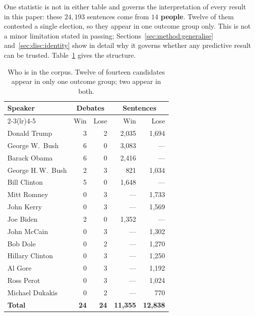 \documentclass[journal]{IEEEtran}
\begin{document}
One statistic is not in either table and governs the interpretation of every
result in this paper: these $24{,}193$ sentences come from
\textbf{$14$ people}. Twelve of them contested a single election, so they
appear in one outcome group only. This is not a minor limitation stated in
passing; Sections~\ref{sec:method:generalise} and~\ref{sec:disc:identity}
show in detail why it governs whether any predictive result can be trusted.
Table~\ref{tab:speakers} gives the structure.

\begin{table}[t]
\caption{Who is in the corpus. Twelve of fourteen candidates appear in only
one outcome group; two appear in both.}
\label{tab:speakers}
\centering
\footnotesize
\setlength{\tabcolsep}{4pt}
\begin{tabular}{lrrrr}
\toprule
Speaker & \multicolumn{2}{c}{Debates} & \multicolumn{2}{c}{Sentences} \\
\cmidrule(lr){2-3}\cmidrule(lr){4-5}
        & Win & Lose & Win & Lose \\
\midrule
Donald Trump        & 3 & 2 & 2{,}035 & 1{,}694 \\
George W.\ Bush     & 6 & 0 & 3{,}083 & --- \\
Barack Obama        & 6 & 0 & 2{,}416 & --- \\
George H.\,W.\ Bush & 2 & 3 & 821     & 1{,}034 \\
Bill Clinton        & 5 & 0 & 1{,}648 & --- \\
Mitt Romney         & 0 & 3 & ---     & 1{,}733 \\
John Kerry          & 0 & 3 & ---     & 1{,}569 \\
Joe Biden           & 2 & 0 & 1{,}352 & --- \\
John McCain         & 0 & 3 & ---     & 1{,}302 \\
Bob Dole            & 0 & 2 & ---     & 1{,}270 \\
Hillary Clinton     & 0 & 3 & ---     & 1{,}250 \\
Al Gore             & 0 & 3 & ---     & 1{,}192 \\
Ross Perot          & 0 & 3 & ---     & 1{,}024 \\
Michael Dukakis     & 0 & 2 & ---     & 770 \\
\midrule
\textbf{Total}      & \textbf{24} & \textbf{24} & \textbf{11{,}355} & \textbf{12{,}838} \\
\bottomrule
\end{tabular}
\end{table}
\end{document}
